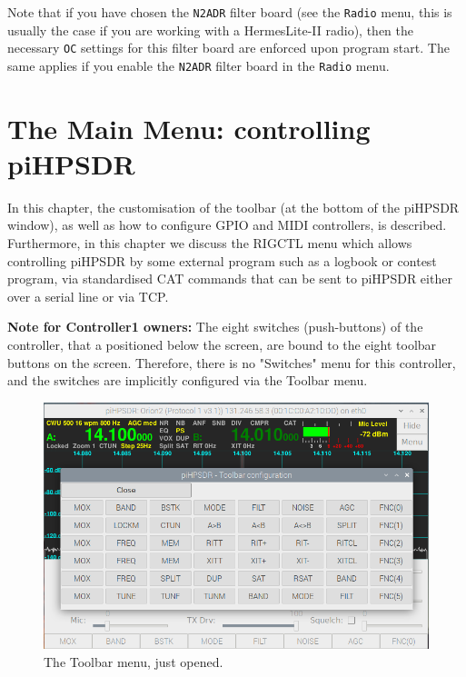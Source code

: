 \documentclass[12pt]{book}
\def\bltt#1{\texttt{\color{blue}#1}}
\def\pH{pi\-HPSDR }
\begin{document}
Note that if you have chosen the \texttt{N2ADR} filter board (see the \bltt{Radio} menu,
this is usually the
case if you are working with a HermesLite-II radio), then the necessary \bltt{OC}
settings for this filter board are enforced upon program start. The same applies if
you enable the \texttt{N2ADR} filter board in the \bltt{Radio} menu.

\chapter[Controlling \pH]{The Main Menu: controlling \pH}

In this chapter, the customisation of the toolbar (at the bottom of the \pH window),
as well as how to configure GPIO and MIDI controllers, is described. Furthermore, in this
chapter we discuss the RIGCTL menu which allows controlling \pH by some external program
such as a logbook or contest program, via standardised CAT commands that can be sent to
\pH either over a serial line or via TCP.

\textbf{Note for Controller1 owners:} The eight switches (push-buttons) of the controller,
that a positioned below the screen, are bound to the eight toolbar buttons on the screen.
Therefore, there is no "Switches" menu for this controller, and the switches are implicitly
configured via the Toolbar menu.

\begin{figure}[ht]
\center
\includegraphics[width=12cm]{ToolbarMenu1.png}
\caption{The Toolbar menu, just opened.}
\label{fig:ToolbarMenu1}
\end{figure}
\end{document}
